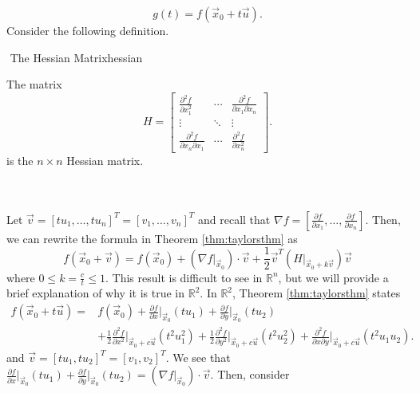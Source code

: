     \begin{equation*}
        g(t)=f(\vec{x}_0+t\vec{u}).
    \end{equation*}
    Consider the following definition.
    \begin{definition}{\Stop\,\,The Hessian Matrix}{hessian}

        The matrix
        \begin{equation*}
            H=\begin{bmatrix}
                \frac{\partial^2f}{\partial x_1^2} & \cdots & \frac{\partial^2f}{\partial x_1\partial x_n} \\
                \vdots & \ddots & \vdots \\
                \frac{\partial^2f}{\partial x_n\partial x_1} & \cdots & \frac{\partial^2f}{\partial x_n^2}
            \end{bmatrix}.
        \end{equation*}
        is the \(n\times n\) Hessian matrix.
        
    \end{definition}
    \vphantom
    \\
    \\
    Let \(\vec{v}=[tu_1,\ldots,tu_n]^T=[v_1,\ldots,v_n]^T\) and recall that \(\nabla f=\left[\frac{\partial f}{\partial x_1},\ldots,\frac{\partial f}{\partial x_n}\right]\). Then, we can rewrite the formula in Theorem \ref{thm:taylorsthm} as
    \begin{equation*}
        f(\vec{x}_0+\vec{v})=f(\vec{x}_0)+\left(\nabla f\Big|_{\vec{x}_0}\right)\cdot\vec{v}+\frac{1}{2}\vec{v}^T\left(H\Big|_{\vec{x}_0+k\vec{v}}\right)\vec{v}
    \end{equation*}
    where \(0\leq k=\frac{c}{t}\leq 1\). This result is difficult to see in \(\mathbb{R}^n\), but we will provide a brief explanation of why it is true in \(\mathbb{R}^2\). In \(\mathbb{R}^2\), Theorem \ref{thm:taylorsthm} states
    \begin{align*}
        f(\vec{x}_0+t\vec{u})=&f(\vec{x}_0)+\frac{\partial f}{\partial x}\Big|_{\vec{x}_0}(tu_1)+\frac{\partial f}{\partial y}\Big|_{\vec{x}_0}(tu_2)\\&+\frac{1}{2}\frac{\partial^2 f}{\partial x^2}\Big|_{\vec{x}_0+c\vec{u}}(t^2u_1^2)+\frac{1}{2}\frac{\partial^2 f}{\partial y^2}\Big|_{\vec{x}_0+c\vec{u}}(t^2u_2^2)+\frac{\partial^2f}{\partial x\partial y}\Big|_{\vec{x}_0+c\vec{u}}(t^2u_1u_2).
    \end{align*}
    and \(\vec{v}=[tu_1,tu_2]^T=[v_1,v_2]^T\). We see that \(\frac{\partial f}{\partial x}\Big|_{\vec{x}_0}(tu_1)+\frac{\partial f}{\partial y}\Big|_{\vec{x}_0}(tu_2)=\left(\nabla f\Big|_{\vec{x}_0}\right)\cdot\vec{v}\). Then, consider
